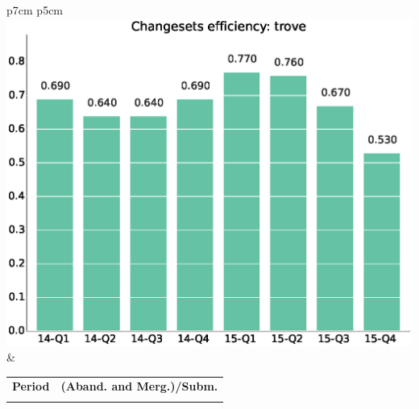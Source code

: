 \documentclass[a4wide,11pt]{article}
\begin{document}
\begin{tabular}{p{7cm} p{5cm}}
    \vspace{0pt} 
    \includegraphics[scale=.35]{figs/bmiscrtrove.eps}
    & 
    \vspace{0pt}
    \begin{tabular}{l|l}%
    \bfseries Period & \bfseries (Aband. and Merg.)/Subm. %
    \csvreader[head to column names]{data/submitted_reviewstrove.csv}{}%
    {\\ & \bmi}
    \end{tabular}
\end{tabular}
\end{document}
